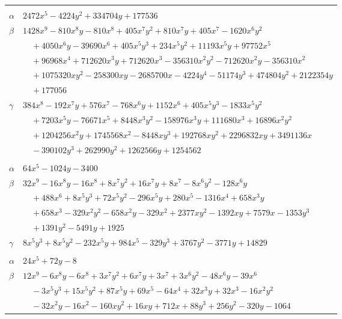 \documentclass[11pt]{article}
\begin{document}
\begin{longtable}{@{}ll@{}}
\addlinespace[3pt]
\multicolumn{2}{@{}l}{$\{i,j\}=\{11,28\}$, $k_{ij}=2^{5}\cdot 3\cdot 5$}\\
$\alpha$ & $2472x^{5}-4224y^{2}+334704y+177536$\\
$\beta$ & $1428x^{9}-810x^{8}y-810x^{8}+405x^{7}y^{2}+810x^{7}y+405x^{7}-1620x^{6}y^{2}$\\
 & $\quad +4050x^{6}y-39690x^{6}+405x^{5}y^{3}+234x^{5}y^{2}+11193x^{5}y+97752x^{5}$\\
 & $\quad +96968x^{4}+712620x^{3}y+712620x^{3}-356310x^{2}y^{2}-712620x^{2}y-356310x^{2}$\\
 & $\quad +1075320xy^{2}-258300xy-2685700x-4224y^{4}-51174y^{3}+474804y^{2}+2122354y$\\
 & $\quad +177056$\\
$\gamma$ & $384x^{8}-192x^{7}y+576x^{7}-768x^{6}y+1152x^{6}+405x^{5}y^{3}-1833x^{5}y^{2}$\\
 & $\quad +7203x^{5}y-76671x^{5}+8448x^{3}y^{2}-158976x^{3}y+111680x^{3}+16896x^{2}y^{2}$\\
 & $\quad +1204256x^{2}y+1745568x^{2}-8448xy^{3}+192768xy^{2}+2296832xy+3491136x$\\
 & $\quad -390102y^{3}+262990y^{2}+1262566y+1254562$\\
\addlinespace[3pt]
\multicolumn{2}{@{}l}{$\{i,j\}=\{11,33\}$, $k_{ij}=2^{5}\cdot 3^{3}\cdot 11$}\\
$\alpha$ & $64x^{5}-1024y-3400$\\
$\beta$ & $32x^{9}-16x^{8}y-16x^{8}+8x^{7}y^{2}+16x^{7}y+8x^{7}-8x^{6}y^{2}-128x^{6}y$\\
 & $\quad +488x^{6}+8x^{5}y^{3}+72x^{5}y^{2}-296x^{5}y+280x^{5}-1316x^{4}+658x^{3}y$\\
 & $\quad +658x^{3}-329x^{2}y^{2}-658x^{2}y-329x^{2}+2377xy^{2}-1392xy+7579x-1353y^{3}$\\
 & $\quad +1391y^{2}-5491y+1925$\\
$\gamma$ & $8x^{5}y^{3}+8x^{5}y^{2}-232x^{5}y+984x^{5}-329y^{3}+3767y^{2}-3771y+14829$\\
\addlinespace[3pt]
\multicolumn{2}{@{}l}{$\{i,j\}=\{11,36\}$, $k_{ij}=2^{5}\cdot 7\cdot 11$}\\
$\alpha$ & $24x^{5}+72y-8$\\
$\beta$ & $12x^{9}-6x^{8}y-6x^{8}+3x^{7}y^{2}+6x^{7}y+3x^{7}+3x^{6}y^{2}-48x^{6}y-39x^{6}$\\
 & $\quad -3x^{5}y^{3}+15x^{5}y^{2}+87x^{5}y+69x^{5}-64x^{4}+32x^{3}y+32x^{3}-16x^{2}y^{2}$\\
 & $\quad -32x^{2}y-16x^{2}-160xy^{2}+16xy+712x+88y^{3}+256y^{2}-320y-1064$\\

\end{longtable}
\end{document}

